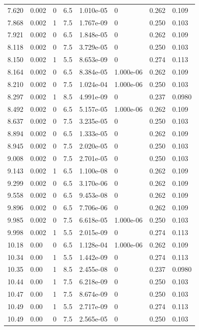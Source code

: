 \documentclass[preview]{standalone}
\begin{document}
{{{\begin{tabular}{L{1.2cm}C{1.2cm} C{0.3cm}C{0.5cm} C{1.4cm}C{1.4cm} C{1.4cm}C{1.4cm}}
  7.620  &  0.002  & 0     & 6.5 &  1.010e-05  & 0  & 0.262 &  0.109   \\ 
  7.868  &  0.002  & 1     & 7.5 &  1.767e-09  & 0  & 0.250 &  0.103   \\ 
  7.921  &  0.002  & 0     & 6.5 &  1.848e-05  & 0  & 0.262 &  0.109   \\ 
  8.118  &  0.002  & 0     & 7.5 &  3.729e-05  & 0  & 0.250 &  0.103   \\ 
  8.150  &  0.002  & 1     & 5.5 &  8.653e-09  & 0  & 0.274 &  0.113   \\ 
  8.164  &  0.002  & 0     & 6.5 &  8.384e-05  & 1.000e-06  & 0.262 &  0.109   \\ 
  8.210  &  0.002  & 0     & 7.5 &  1.024e-04  & 1.000e-06  & 0.250 &  0.103   \\ 
  8.297  &  0.002  & 1     & 8.5 &  4.991e-09  & 0  & 0.237 &  0.0980   \\ 
  8.492  &  0.002  & 0     & 6.5 &  5.157e-05  & 1.000e-06  & 0.262 &  0.109   \\ 
  8.637  &  0.002  & 0     & 7.5 &  3.235e-05  & 0  & 0.250 &  0.103   \\ 
  8.894  &  0.002  & 0     & 6.5 &  1.333e-05  & 0  & 0.262 &  0.109   \\ 
  8.945  &  0.002  & 0     & 7.5 &  2.020e-05  & 0  & 0.250 &  0.103   \\ 
  9.008  &  0.002  & 0     & 7.5 &  2.701e-05  & 0  & 0.250 &  0.103   \\ 
  9.143  &  0.002  & 1     & 6.5 &  1.100e-08  & 0  & 0.262 &  0.109   \\ 
  9.299  &  0.002  & 0     & 6.5 &  3.170e-06  & 0  & 0.262 &  0.109   \\ 
  9.558  &  0.002  & 0     & 6.5 &  9.453e-08  & 0  & 0.262 &  0.109   \\ 
  9.896  &  0.002  & 0     & 6.5 &  7.706e-06  & 0  & 0.262 &  0.109   \\ 
  9.985  &  0.002  & 0     & 7.5 &  6.618e-05  & 1.000e-06  & 0.250 &  0.103   \\ 
  9.998  &  0.002  & 1     & 5.5 &  2.015e-09  & 0  & 0.274 &  0.113   \\ 
  10.18  &  0.00  & 0     & 6.5 &  1.128e-04  & 1.000e-06  & 0.262 &  0.109   \\ 
  10.34  &  0.00  & 1     & 5.5 &  1.442e-09  & 0  & 0.274 &  0.113   \\ 
  10.35  &  0.00  & 1     & 8.5 &  2.455e-08  & 0  & 0.237 &  0.0980   \\ 
  10.44  &  0.00  & 1     & 7.5 &  6.218e-09  & 0  & 0.250 &  0.103   \\ 
  10.47  &  0.00  & 1     & 7.5 &  8.674e-09  & 0  & 0.250 &  0.103   \\ 
  10.49  &  0.00  & 1     & 5.5 &  2.717e-09  & 0  & 0.274 &  0.113   \\ 
  10.49  &  0.00  & 0     & 7.5 &  2.565e-05  & 0  & 0.250 &  0.103   \\ 
\hline 
\end{tabular} 

}}}
\end{document}

